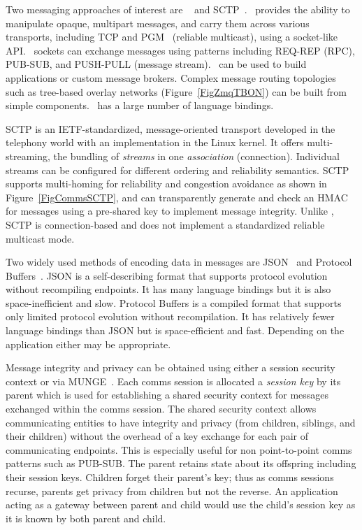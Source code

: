Two messaging approaches of interest are \zMQ~\cite{ZMQGuide} and
SCTP~\cite{SCTP}.
\zMQ\ provides the ability to manipulate opaque, multipart messages,
and carry them across various transports, including TCP and
PGM~\cite{rfc3208} (reliable multicast), using a socket-like API.
\zMQ\ sockets can exchange messages using patterns including
REQ-REP (RPC), PUB-SUB, and PUSH-PULL (message stream).
\zMQ\ can be used to build applications or custom message brokers.
Complex message routing topologies such as tree-based overlay networks
(Figure~\ref{FigZmqTBON}) can be built from simple components.
\zMQ\ has a large number of language bindings.

SCTP is an IETF-standardized, message-oriented transport developed
in the telephony world with an implementation in the Linux kernel.
It offers multi-streaming, the bundling of {\em streams} in one
{\em association} (connection).  Individual streams can be configured for
different ordering and reliability semantics.  SCTP supports
multi-homing for reliability and congestion avoidance as shown in
Figure~\ref{FigCommsSCTP}, and
can transparently generate and check an HMAC for messages using a
pre-shared key to implement message integrity.  Unlike \zMQ, SCTP is
connection-based and does not implement a standardized reliable multicast
mode.

Two widely used methods of encoding data in messages are
JSON~\cite{rfc4627} 
and Protocol Buffers~\cite{Protobuf}.
JSON is a self-describing format
that supports protocol evolution without recompiling endpoints.  It has
many language bindings but it is also space-inefficient and slow.
Protocol Buffers is a compiled format that supports
only limited protocol evolution without recompilation.  It has relatively
fewer language bindings than JSON but is space-efficient and fast.
Depending on the application either may be appropriate.

Message integrity and privacy can be obtained using either a session
security context or via MUNGE~\cite{MUNGE}.
Each comms session is allocated a {\em session key} by its parent
which is used for establishing a shared security context
for messages exchanged within the comms session.
The shared security context allows communicating entities to have integrity
and privacy (from children, siblings, and their children)
without the overhead
of a key exchange for each pair of communicating endpoints.
This is especially useful for non point-to-point comms patterns such as PUB-SUB.
The parent retains state about its offspring including their session keys.
Children forget their parent's key;  thus as comms sessions recurse,
parents get privacy from children but not the reverse.
An application acting as a gateway between parent and child would use
the child's session key as it is known by both parent and child.

